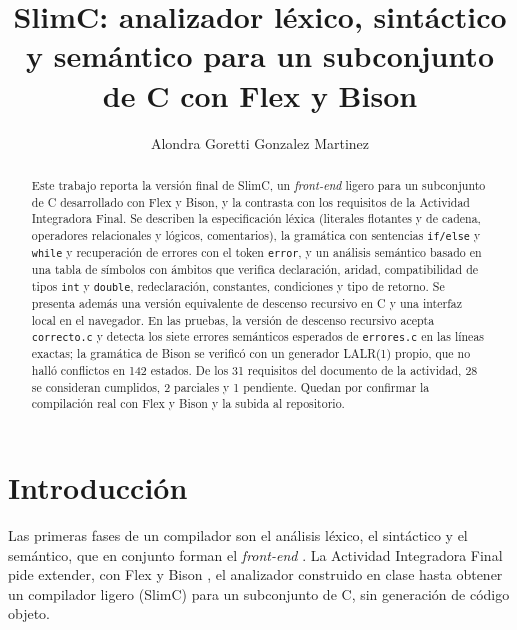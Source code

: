 \documentclass[runningheads]{llncs}
\begin{document}
\title{SlimC: analizador léxico, sintáctico y semántico para un subconjunto de C con Flex y Bison}
\author{Alondra Goretti Gonzalez Martinez}
\maketitle

\begin{abstract}
Este trabajo reporta la versión final de SlimC, un \emph{front-end} ligero para un subconjunto de C desarrollado con Flex y Bison, y la contrasta con los requisitos de la Actividad Integradora Final. Se describen la especificación léxica (literales flotantes y de cadena, operadores relacionales y lógicos, comentarios), la gramática con sentencias \texttt{if/else} y \texttt{while} y recuperación de errores con el token \texttt{error}, y un análisis semántico basado en una tabla de símbolos con ámbitos que verifica declaración, aridad, compatibilidad de tipos \texttt{int} y \texttt{double}, redeclaración, constantes, condiciones y tipo de retorno. Se presenta además una versión equivalente de descenso recursivo en C y una interfaz local en el navegador. En las pruebas, la versión de descenso recursivo acepta \texttt{correcto.c} y detecta los siete errores semánticos esperados de \texttt{errores.c} en las líneas exactas; la gramática de Bison se verificó con un generador LALR(1) propio, que no halló conflictos en 142 estados. De los 31 requisitos del documento de la actividad, 28 se consideran cumplidos, 2 parciales y 1 pendiente. Quedan por confirmar la compilación real con Flex y Bison y la subida al repositorio.
\end{abstract}

\section{Introducción}
Las primeras fases de un compilador son el análisis léxico, el sintáctico y el semántico, que en conjunto forman el \emph{front-end} \cite{aho06}. La Actividad Integradora Final pide extender, con Flex y Bison \cite{levine09}, el analizador construido en clase hasta obtener un compilador ligero (SlimC) para un subconjunto de C, sin generación de código objeto.
\end{document}
